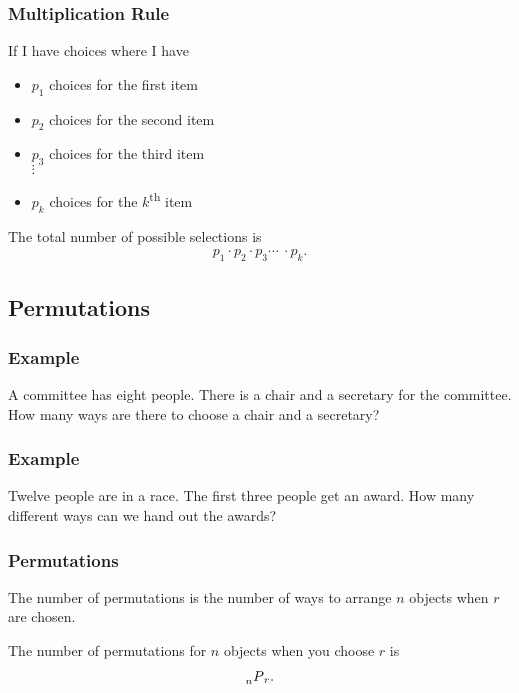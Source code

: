 \begin{frame}
  \frametitle{Multiplication Rule}

  \begin{definition}
    If I have choices where I have
    \begin{itemize}
    \item $p_1$ choices for the first item
    \item $p_2$ choices for the second item
    \item $p_3$ choices for the third item \\
      $\vdots$
    \item $p_k$ choices for the $k$\textsuperscript{th} item \\
    \end{itemize}

    The total number of possible selections is 
    \begin{eqnarray*}
      p_1 \cdot p_2 \cdot p_3 \cdots ~ \cdot p_k.
    \end{eqnarray*}

  \end{definition}

\end{frame}

\subsection{Permutations}

\begin{frame}
  \frametitle{Example}
  A committee has eight people. There is a chair and a secretary for
  the committee. How many ways are there to choose a chair and a
  secretary?

  \vfill

  \textit{{\color{red}{order matters!}}}

\end{frame}

\begin{frame}
  \frametitle{Example}
  Twelve people are in a race. The first three people get an
  award. How many different ways can we hand out the awards?

  \vfill

  \textit{{\color{red}{order matters!}}}
\end{frame}


\begin{frame}
  \frametitle{Permutations}
  \begin{definition}[Permutations]
    The number of permutations is the number of ways to arrange $n$
    objects when $r$ are chosen. \textit{{\color{red}{(The order matters.)}}}
  \end{definition}

  {
    \begin{definition}[Notation]
      The number of permutations for $n$ objects when you choose $r$
      is 
      \begin{eqnarray*}
        \prescript{~}{n}{P}_r.
      \end{eqnarray*}
    \end{definition}
  }

\end{frame}

